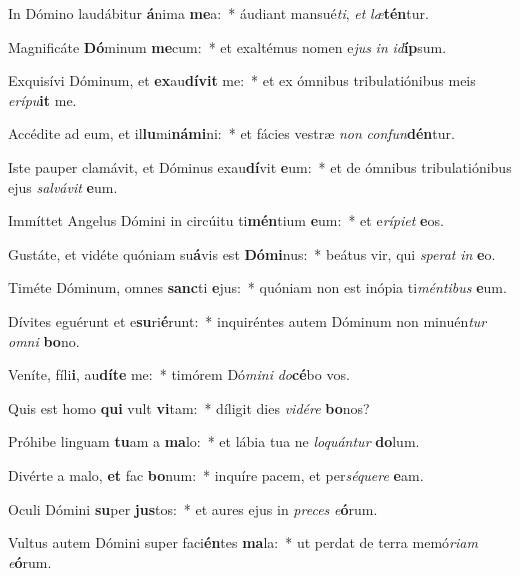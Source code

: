 \item In Dómino laudábitur \textbf{á}nima \textbf{me}a:~* áudiant mansué\textit{ti}, \textit{et} \textit{læ}\textbf{tén}tur.
\item Magnificáte \textbf{Dó}minum \textbf{me}cum:~* et exaltémus nomen e\textit{jus} \textit{in} \textit{id}\textbf{íp}sum.
\item Exquisívi Dóminum, et \textbf{ex}au\textbf{dí}\textbf{vit} me:~* et ex ómnibus tribulatiónibus meis \textit{e}\textit{rí}\textit{pu}\textbf{it} me.
\item Accédite ad eum, et il\textbf{lu}mi\textbf{ná}\textbf{mi}ni:~* et fácies vestræ \textit{non} \textit{con}\textit{fun}\textbf{dén}tur.
\item Iste pauper clamávit, et Dóminus exau\textbf{dí}vit \textbf{e}um:~* et de ómnibus tribulatiónibus ejus \textit{sal}\textit{vá}\textit{vit} \textbf{e}um.
\item Immíttet Angelus Dómini in circúitu ti\textbf{mén}tium \textbf{e}um:~* et e\textit{rí}\textit{pi}\textit{et} \textbf{e}os.
\item Gustáte, et vidéte quóniam su\textbf{á}vis est \textbf{Dó}\textbf{mi}nus:~* beátus vir, qui \textit{spe}\textit{rat} \textit{in} \textbf{e}o.
\item Timéte Dóminum, omnes \textbf{sanc}ti \textbf{e}jus:~* quóniam non est inópia ti\textit{mén}\textit{ti}\textit{bus} \textbf{e}um.
\item Dívites eguérunt et e\textbf{su}ri\textbf{é}runt:~* inquiréntes autem Dóminum non minuén\textit{tur} \textit{om}\textit{ni} \textbf{bo}no.
\item Veníte, fíli\textbf{i}, au\textbf{dí}\textbf{te} me:~* timórem Dó\textit{mi}\textit{ni} \textit{do}\textbf{cé}bo vos.
\item Quis est homo \textbf{qui} vult \textbf{vi}tam:~* díligit dies \textit{vi}\textit{dé}\textit{re} \textbf{bo}nos?
\item Próhibe linguam \textbf{tu}am a \textbf{ma}lo:~* et lábia tua ne \textit{lo}\textit{quán}\textit{tur} \textbf{do}lum.
\item Divérte a malo, \textbf{et} fac \textbf{bo}num:~* inquíre pacem, et per\textit{sé}\textit{que}\textit{re} \textbf{e}am.
\item Oculi Dómini \textbf{su}per \textbf{jus}tos:~* et aures ejus in \textit{pre}\textit{ces} \textit{e}\textbf{ó}rum.
\item Vultus autem Dómini super faci\textbf{én}tes \textbf{ma}la:~* ut perdat de terra memó\textit{ri}\textit{am} \textit{e}\textbf{ó}rum.
